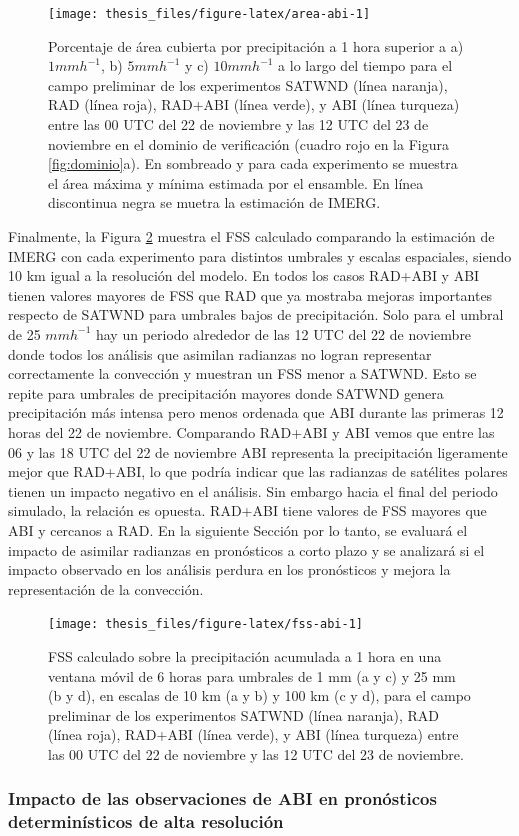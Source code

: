 \documentclass[12pt,oneside,a4paper]{reedthesis}
\begin{document}
\begin{figure}
\texttt{[image: thesis\_files/figure-latex/area-abi-1]} \caption{Porcentaje de área cubierta por precipitación a 1 hora superior a a) \(1 mmh^{-1}\), b) \(5 mmh^{-1}\) y c) \(10 mmh^{-1}\) a lo largo del tiempo para el campo preliminar de los experimentos SATWND (línea naranja), RAD (línea roja), RAD+ABI (línea verde), y ABI (línea turqueza) entre las 00 UTC del 22 de noviembre y las 12 UTC del 23 de noviembre en el dominio de verificación (cuadro rojo en la Figura \ref{fig:dominio}a). En sombreado y para cada experimento se muestra el área máxima y mínima estimada por el ensamble. En línea discontinua negra se muetra la estimación de IMERG.}\label{fig:area-abi}
\end{figure}
Finalmente, la Figura \ref{fig:fss-abi} muestra el FSS calculado comparando la estimación de IMERG con cada experimento para distintos umbrales y escalas espaciales, siendo 10 km igual a la resolución del modelo. En todos los casos RAD+ABI y ABI tienen valores mayores de FSS que RAD que ya mostraba mejoras importantes respecto de SATWND para umbrales bajos de precipitación. Solo para el umbral de 25 \(mmh^{-1}\) hay un periodo alrededor de las 12 UTC del 22 de noviembre donde todos los análisis que asimilan radianzas no logran representar correctamente la convección y muestran un FSS menor a SATWND. Esto se repite para umbrales de precipitación mayores donde SATWND genera precipitación más intensa pero menos ordenada que ABI durante las primeras 12 horas del 22 de noviembre. Comparando RAD+ABI y ABI vemos que entre las 06 y las 18 UTC del 22 de noviembre ABI representa la precipitación ligeramente mejor que RAD+ABI, lo que podría indicar que las radianzas de satélites polares tienen un impacto negativo en el análisis. Sin embargo hacia el final del periodo simulado, la relación es opuesta. RAD+ABI tiene valores de FSS mayores que ABI y cercanos a RAD. En la siguiente Sección por lo tanto, se evaluará el impacto de asimilar radianzas en pronósticos a corto plazo y se analizará si el impacto observado en los análisis perdura en los pronósticos y mejora la representación de la convección.


\begin{figure}
\texttt{[image: thesis\_files/figure-latex/fss-abi-1]} \caption{FSS calculado sobre la precipitación acumulada a 1 hora en una ventana móvil de 6 horas para umbrales de 1 mm (a y c) y 25 mm (b y d), en escalas de 10 km (a y b) y 100 km (c y d), para el campo preliminar de los experimentos SATWND (línea naranja), RAD (línea roja), RAD+ABI (línea verde), y ABI (línea turqueza) entre las 00 UTC del 22 de noviembre y las 12 UTC del 23 de noviembre.}\label{fig:fss-abi}
\end{figure}
\hypertarget{impacto-de-las-observaciones-de-abi-en-pronuxf3sticos-determinuxedsticos-de-alta-resoluciuxf3n}{%
\subsubsection{Impacto de las observaciones de ABI en pronósticos determinísticos de alta resolución}\label{impacto-de-las-observaciones-de-abi-en-pronuxf3sticos-determinuxedsticos-de-alta-resoluciuxf3n}}
\end{document}
